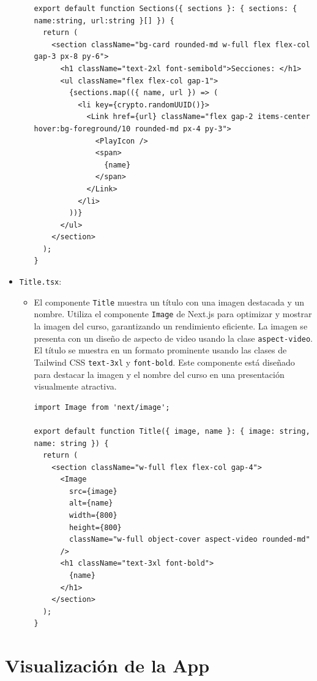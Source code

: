 \begin{itemize}
\begin{itemize}
\begin{verbatim}
export default function Sections({ sections }: { sections: { name:string, url:string }[] }) {
  return (
    <section className="bg-card rounded-md w-full flex flex-col gap-3 px-8 py-6">
      <h1 className="text-2xl font-semibold">Secciones: </h1>
      <ul className="flex flex-col gap-1">
        {sections.map(({ name, url }) => (
          <li key={crypto.randomUUID()}>
            <Link href={url} className="flex gap-2 items-center hover:bg-foreground/10 rounded-md px-4 py-3">
              <PlayIcon />
              <span>
                {name}
              </span>
            </Link>
          </li>
        ))}
      </ul>
    </section>
  );
}
    \end{verbatim}
  \end{itemize}  
  \item \texttt{Title.tsx}:
  \begin{itemize}
    \item  El componente \texttt{Title} muestra un título con una imagen destacada y un nombre. Utiliza el componente \texttt{Image} de Next.js para optimizar y mostrar la imagen del curso, garantizando un rendimiento eficiente. La imagen se presenta con un diseño de aspecto de video usando la clase \texttt{aspect-video}. El título se muestra en un formato prominente usando las clases de Tailwind CSS \texttt{text-3xl} y \texttt{font-bold}. Este componente está diseñado para destacar la imagen y el nombre del curso en una presentación visualmente atractiva.
    \begin{verbatim}
import Image from 'next/image';

export default function Title({ image, name }: { image: string, name: string }) {
  return (
    <section className="w-full flex flex-col gap-4">
      <Image
        src={image}
        alt={name}
        width={800}
        height={800}
        className="w-full object-cover aspect-video rounded-md"
      />
      <h1 className="text-3xl font-bold">
        {name}
      </h1>
    </section>
  );
}
    \end{verbatim}
  \end{itemize}  
\end{itemize}

\section{Visualización de la App}
